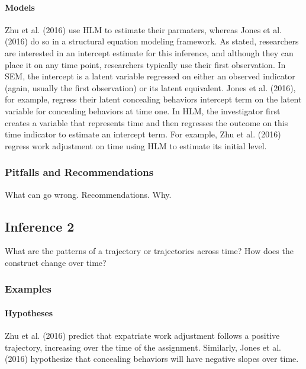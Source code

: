 \documentclass[english,,man]{apa6}
\let\oldparagraph\paragraph
\renewcommand{\paragraph}[1]{\oldparagraph{#1}\mbox{}}
\theoremstyle{definition}
\theoremstyle{definition}
\theoremstyle{definition}
\theoremstyle{remark}
\begin{document}
\hypertarget{models-1}{%
\paragraph{Models}\label{models-1}}

Zhu et al. (2016) use HLM to estimate their parmaters, whereas Jones et
al. (2016) do so in a structural equation modeling framework. As stated,
researchers are interested in an intercept estimate for this inference,
and although they can place it on any time point, researchers typically
use their first observation. In SEM, the intercept is a latent variable
regressed on either an observed indicator (again, usually the first
observation) or its latent equivalent. Jones et al. (2016), for example,
regress their latent concealing behaviors intercept term on the latent
variable for concealing behaviors at time one. In HLM, the investigator
first creates a variable that represents time and then regresses the
outcome on this time indicator to estimate an intercept term. For
example, Zhu et al. (2016) regress work adjustment on time using HLM to
estimate its initial level.

\hypertarget{pitfalls-and-recommendations-1}{%
\subsubsection{Pitfalls and
Recommendations}\label{pitfalls-and-recommendations-1}}

What can go wrong. Recommendations. Why.

\hypertarget{inference-2}{%
\subsection{Inference 2}\label{inference-2}}

What are the patterns of a trajectory or trajectories across time? How
does the construct change over time?

\hypertarget{examples-1}{%
\subsubsection{Examples}\label{examples-1}}

\hypertarget{hypotheses-2}{%
\paragraph{Hypotheses}\label{hypotheses-2}}

Zhu et al. (2016) predict that expatriate work adjustment follows a
positive trajectory, increasing over the time of the assignment.
Similarly, Jones et al. (2016) hypothesize that concealing behaviors
will have negative slopes over time.
\end{document}
